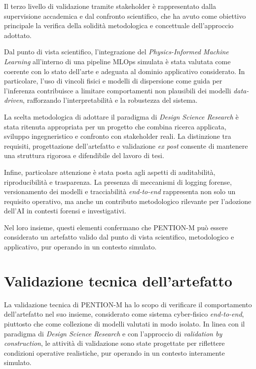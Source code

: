 Il terzo livello di validazione tramite stakeholder è rappresentato dalla supervisione accademica e dal confronto scientifico, che ha avuto come obiettivo principale la verifica della solidità metodologica e concettuale dell’approccio adottato.

Dal punto di vista scientifico, l’integrazione del \emph{Physics-Informed Machine Learning} all’interno di una pipeline MLOps simulata è stata valutata come coerente con lo stato dell’arte e adeguata al dominio applicativo considerato.
In particolare, l’uso di vincoli fisici e modelli di dispersione come guida per l’inferenza contribuisce a limitare comportamenti non plausibili dei modelli \textit{data-driven}, rafforzando l’interpretabilità e la robustezza del sistema.

La scelta metodologica di adottare il paradigma di \emph{Design Science Research} è stata ritenuta appropriata per un progetto che combina ricerca applicata, sviluppo ingegneristico e confronto con stakeholder reali.
La distinzione tra requisiti, progettazione dell’artefatto e validazione \textit{ex post} consente di mantenere una struttura rigorosa e difendibile del lavoro di tesi.

Infine, particolare attenzione è stata posta agli aspetti di auditabilità, riproducibilità e trasparenza.
La presenza di meccanismi di logging forense, versionamento dei modelli e tracciabilità \textit{end-to-end} rappresenta non solo un requisito operativo, ma anche un contributo metodologico rilevante per l’adozione dell’AI in contesti forensi e investigativi.

Nel loro insieme, questi elementi confermano che PENTION-M può essere considerato un artefatto valido dal punto di vista scientifico, metodologico e applicativo, pur operando in un contesto simulato.

\section{Validazione tecnica dell’artefatto}
\label{sec:technical_validation}

La validazione tecnica di \textsc{PENTION-M} ha lo scopo di verificare il comportamento dell’artefatto nel suo insieme, considerato come sistema cyber-fisico \textit{end-to-end}, piuttosto che come collezione di modelli valutati in modo isolato.
In linea con il paradigma di \emph{Design Science Research} e con l’approccio di \emph{validation by construction}, le attività di validazione sono state progettate per riflettere condizioni operative realistiche, pur operando in un contesto interamente simulato.

